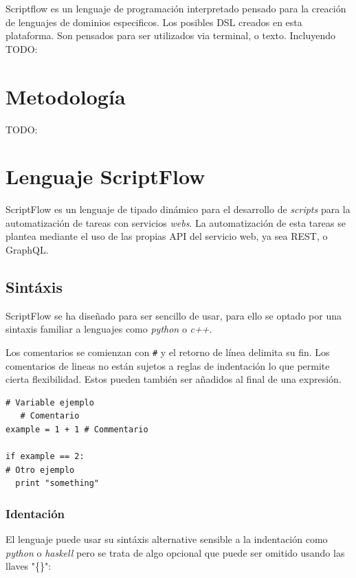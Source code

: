 \documentclass[11pt]{article}
\begin{document}
Scriptflow es un lenguaje de programación interpretado pensado para la creación de lenguajes de dominios especificos.
Los posibles DSL creados en esta plataforma. Son pensados para ser utilizados via terminal, o texto. Incluyendo
TODO:

\section{Metodología}
\label{sec:org3e3894b}

TODO:

\section{Lenguaje ScriptFlow}
\label{sec:org07793b5}

ScriptFlow es un lenguaje de tipado dinámico para el desarrollo de \emph{scripts} para la automatización de tareas
con servicios \emph{webs}. La automatización de esta tareas se plantea mediante el uso de las propias API del servicio web, ya sea REST, o GraphQL.

\subsection{Sintáxis}
\label{sec:orge5634bd}

ScriptFlow se ha diseñado para ser sencillo de usar, para ello se optado por una sintaxis familiar a lenguajes como
\emph{python} o \emph{c++}.

Los comentarios se comienzan con \texttt{\#} y el retorno de línea delimita su fin. Los comentarios de lineas no están sujetos a reglas de indentación
lo que permite cierta flexibilidad. Estos pueden también ser añadidos al final de una expresión.

\begin{verbatim}
# Variable ejemplo
   # Comentario
example = 1 + 1 # Commentario

if example == 2:
# Otro ejemplo
  print "something"
\end{verbatim}

\subsubsection{Identación}
\label{sec:orgb8f3e50}

\label{orgc30c940}
El lenguaje puede usar su sintáxis alternative sensible a la indentación como \emph{python} o \emph{haskell} pero se trata de algo opcional que puede ser omitido usando las llaves "\{\}":
\end{document}
